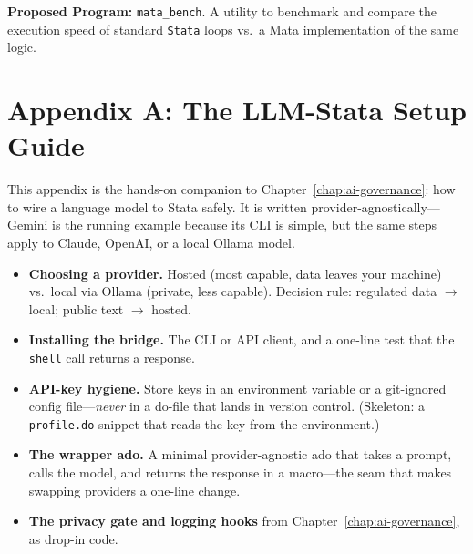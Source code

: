 \documentclass[
    a4paper,
    fontsize=10pt,
    twoside=true,
    numbers=noenddot,
]{kaobook}
\providecommand{\Environment}[1]{\texttt{#1}}
\begin{document}
\begin{kaobox}[frametitle=Ado-file Idea: \texttt{mata\_bench}]
\textbf{Proposed Program:} \texttt{mata\_bench}. A utility to benchmark and compare the execution speed of standard \Environment{Stata} loops vs.\ a Mata implementation of the same logic.
\end{kaobox}



\chapter*{Appendix A: The LLM-Stata Setup Guide}
This appendix is the hands-on companion to Chapter~\ref{chap:ai-governance}: how to wire a language model to Stata safely. It is written provider-agnostically---Gemini is the running example because its CLI is simple, but the same steps apply to Claude, OpenAI, or a local Ollama model.
\begin{itemize}
    \item \textbf{Choosing a provider.} Hosted (most capable, data leaves your machine) vs.\ local via Ollama (private, less capable). Decision rule: regulated data $\rightarrow$ local; public text $\rightarrow$ hosted.
    \item \textbf{Installing the bridge.} The CLI or API client, and a one-line test that the \texttt{shell} call returns a response.
    \item \textbf{API-key hygiene.} Store keys in an environment variable or a git-ignored config file---\emph{never} in a do-file that lands in version control. (Skeleton: a \texttt{profile.do} snippet that reads the key from the environment.)
    \item \textbf{The wrapper ado.} A minimal provider-agnostic ado that takes a prompt, calls the model, and returns the response in a macro---the seam that makes swapping providers a one-line change.
    \item \textbf{The privacy gate and logging hooks} from Chapter~\ref{chap:ai-governance}, as drop-in code.
\end{itemize}
\end{document}
